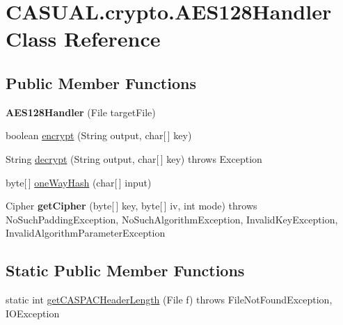 \hypertarget{classCASUAL_1_1crypto_1_1AES128Handler}{\section{C\-A\-S\-U\-A\-L.\-crypto.\-A\-E\-S128\-Handler Class Reference}
\label{classCASUAL_1_1crypto_1_1AES128Handler}
}
\subsection*{Public Member Functions}
\begin{DoxyCompactItemize}
\item 
\hypertarget{classCASUAL_1_1crypto_1_1AES128Handler_a4233be364193baf998724234ca4c7ab1}{{\bfseries A\-E\-S128\-Handler} (File target\-File)}\label{classCASUAL_1_1crypto_1_1AES128Handler_a4233be364193baf998724234ca4c7ab1}

\item 
boolean \hyperlink{classCASUAL_1_1crypto_1_1AES128Handler_ae444a266163b8c7983391cfeca91fd9f}{encrypt} (String output, char\mbox{[}$\,$\mbox{]} key)
\item 
String \hyperlink{classCASUAL_1_1crypto_1_1AES128Handler_a27231903f5c8ee3bea634e915c0e1499}{decrypt} (String output, char\mbox{[}$\,$\mbox{]} key)  throws Exception 
\item 
byte\mbox{[}$\,$\mbox{]} \hyperlink{classCASUAL_1_1crypto_1_1AES128Handler_af8b956ca34bcdbb8a22551fe66ae2c65}{one\-Way\-Hash} (char\mbox{[}$\,$\mbox{]} input)
\item 
\hypertarget{classCASUAL_1_1crypto_1_1AES128Handler_aa057ae7e639b9622dbed9b17443aa263}{Cipher {\bfseries get\-Cipher} (byte\mbox{[}$\,$\mbox{]} key, byte\mbox{[}$\,$\mbox{]} iv, int mode)  throws No\-Such\-Padding\-Exception, No\-Such\-Algorithm\-Exception, Invalid\-Key\-Exception, Invalid\-Algorithm\-Parameter\-Exception }\label{classCASUAL_1_1crypto_1_1AES128Handler_aa057ae7e639b9622dbed9b17443aa263}

\end{DoxyCompactItemize}
\subsection*{Static Public Member Functions}
\begin{DoxyCompactItemize}
\item 
static int \hyperlink{classCASUAL_1_1crypto_1_1AES128Handler_af7d875ad9b71ba6177d93b3f8d2e9b7f}{get\-C\-A\-S\-P\-A\-C\-Header\-Length} (File f)  throws File\-Not\-Found\-Exception, I\-O\-Exception 
\end{DoxyCompactItemize}


